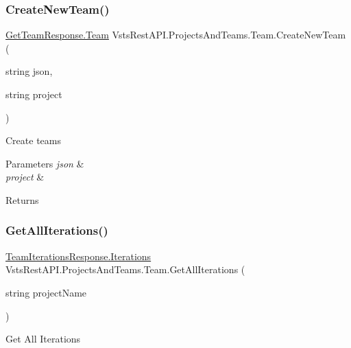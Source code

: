 \subsubsection{\texorpdfstring{Create\+New\+Team()}{CreateNewTeam()}}
{\footnotesize\ttfamily \mbox{\hyperlink{class_vsts_rest_a_p_i_1_1_viewmodel_1_1_project_and_teams_1_1_get_team_response_1_1_team}{Get\+Team\+Response.\+Team}} Vsts\+Rest\+A\+P\+I.\+Projects\+And\+Teams.\+Team.\+Create\+New\+Team (\begin{DoxyParamCaption}\item[{string}]{json,  }\item[{string}]{project }\end{DoxyParamCaption})}



Create teams 


\begin{DoxyParams}{Parameters}
{\em json} & \\
\hline
{\em project} & \\
\hline
\end{DoxyParams}
\begin{DoxyReturn}{Returns}

\end{DoxyReturn}
\mbox{\label{class_vsts_rest_a_p_i_1_1_projects_and_teams_1_1_team_a719daa0225d480d779037baaa901c201}} 
\subsubsection{\texorpdfstring{Get\+All\+Iterations()}{GetAllIterations()}}
{\footnotesize\ttfamily \mbox{\hyperlink{class_vsts_rest_a_p_i_1_1_viewmodel_1_1_project_and_teams_1_1_team_iterations_response_1_1_iterations}{Team\+Iterations\+Response.\+Iterations}} Vsts\+Rest\+A\+P\+I.\+Projects\+And\+Teams.\+Team.\+Get\+All\+Iterations (\begin{DoxyParamCaption}\item[{string}]{project\+Name }\end{DoxyParamCaption})}



Get All Iterations 


